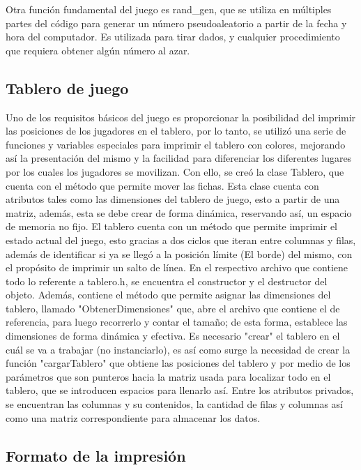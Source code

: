 	Otra función fundamental del juego es rand_gen, que se utiliza en múltiples partes del
código para generar un número pseudoaleatorio a partir de la fecha y hora del computador. Es 
utilizada para tirar dados, y cualquier procedimiento que requiera obtener algún número al azar.

\subsection{Tablero de juego}

	Uno de los requisitos básicos del juego es proporcionar la posibilidad del imprimir las
posiciones de los jugadores en el tablero, por lo tanto, se utilizó una serie de funciones y 
variables especiales para imprimir el tablero con colores, mejorando así la presentación del mismo
y la facilidad para diferenciar los diferentes lugares por los cuales los jugadores se movilizan.
Con ello, se creó la clase Tablero, que cuenta con el método que permite mover las fichas. Esta
clase cuenta con atributos tales como las dimensiones del tablero de juego, esto a partir de una
matriz, además, esta se debe crear de forma dinámica, reservando así, un espacio de memoria no 
fijo.
	El tablero cuenta con un método que permite imprimir el estado actual del juego, esto
gracias a dos ciclos que iteran entre columnas y filas, además de identificar si ya se llegó a 
la posición límite (El borde) del mismo, con el propósito de imprimir un salto de línea.
	En el respectivo archivo que contiene todo lo referente a tablero.h, se encuentra el 
constructor y el destructor del objeto. Además, contiene el método que permite asignar las
dimensiones del tablero, llamado "ObtenerDimensiones" que, abre el archivo que contiene el
de referencia, para luego recorrerlo y contar el tamaño; de esta forma, establece las 
dimensiones de forma dinámica y efectiva.
	Es necesario "crear" el tablero en el cuál se va a trabajar (no instanciarlo), es así
como surge la necesidad de crear la función "cargarTablero" que obtiene las posiciones del
tablero y por medio de los parámetros que son punteros hacia la matriz usada para localizar
todo en el tablero, que se introducen espacios para llenarlo así.
	Entre los atributos privados, se encuentran las columnas y su contenidos, la cantidad
de filas y columnas así como una matriz correspondiente para almacenar los datos.

\subsection{Formato de la impresión}
	
